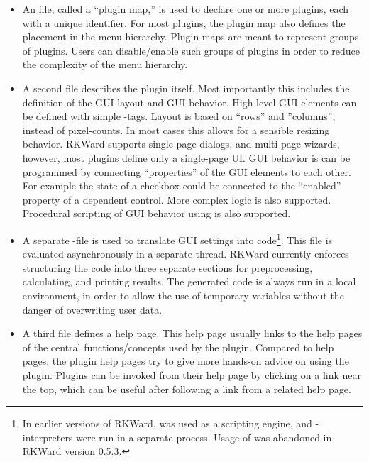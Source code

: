 \begin{itemize}
    \item
    An  file, called a ``plugin map,'' is used to declare one or more plugins, each
    with a unique identifier. For most plugins, the plugin map also defines the
    placement in the menu hierarchy. Plugin maps are meant to represent groups of
    plugins. Users can disable/enable such groups of plugins in order to reduce the
    complexity of the menu hierarchy.

    \item
    A second  file describes the plugin itself. Most importantly this includes
    the definition of the GUI-layout and GUI-behavior. High level GUI-elements can
    be defined with simple -tags. Layout is based on ``rows'' and ''columns'',
    instead of pixel-counts. In most cases this allows for a sensible resizing
    behavior. RKWard supports single-page dialogs, and multi-page wizards, however,
    most plugins define only a single-page UI. GUI behavior is can be programmed by
    connecting ``properties'' of the GUI elements to each other. For example the state
    of a checkbox could be connected to the ``enabled'' property of a dependent
    control. More complex logic is also supported. Procedural scripting of GUI
    behavior using  is also supported.

    \item
    A separate -file is used to translate GUI settings into 
    code\footnote{
        In earlier versions of RKWard,  was used
        as a scripting engine, and -interpreters were run in a separate process.
        Usage of  was abandoned in RKWard version 0.5.3.
    }. This  file is evaluated asynchronously in a separate thread. RKWard
    currently enforces structuring the code into three separate sections for
    preprocessing, calculating, and printing results. The generated code is always
    run in a local environment, in order to allow the use of temporary variables
    without the danger of overwriting user data.

    \item
    A third  file defines a help page. This help page usually links to the  help
    pages of the central functions/concepts used by the plugin. Compared to  help
    pages, the plugin help pages try to give more hands-on advice on using the
    plugin. Plugins can be invoked from their help page by clicking on a link near
    the top, which can be useful after following a link from a related help page.
\end{itemize}


